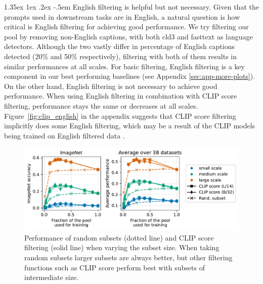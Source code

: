 \documentclass[dvipsnames,11pt]{article}
\makeatletter
\renewcommand\paragraph{\@startsection{paragraph}{4}{\z@}                                     {1.35ex \@plus1ex \@minus.2ex}                                {-.5em}
{\normalfont\normalsize\bfseries}}
\makeatother
\begin{document}
\paragraph{English filtering is helpful but not necessary.}
Given that the prompts used in downstream tasks are in English, a natural question is how critical is English filtering for achieving good performance. We try filtering our pool by removing non-English captions, with both cld3 and fasttext as language detectors. Although the two vastly differ in percentage of English captions detected (20\% and 50\% respectively), filtering with both of them results in similar performances at all scales.  
For basic filtering, English filtering is a key component in our best performing baselines (see Appendix \ref{sec:app-more-plots}).
On the other hand, English filtering is not necessary to achieve good performance. When using English filtering in combination with CLIP score filtering, performance stays the same or decreases at all scales.
Figure~\ref{fig:clip_english} in the appendix suggests that CLIP score filtering implicitly does some English filtering, which may be a result of the CLIP models being trained on English filtered data \cite{radford2021learning}.

\begin{figure}
    \centering
    \includegraphics[width=\linewidth]{figures/clip_threshold.pdf}
    \caption{Performance of random subsets (dotted line) and CLIP score filtering (solid line) when varying the subset size. When taking random subsets larger subsets are always better, but other filtering functions such as CLIP score perform best with subsets of intermediate size.}
    \label{fig:clip-th}
\end{figure}
\end{document}
